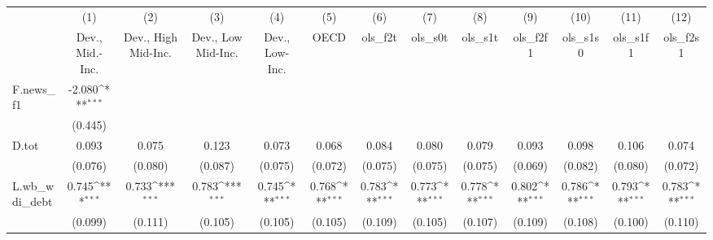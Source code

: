 {
\def\sym#1{\ifmmode^{#1}\else\(^{#1}\)\fi}
\begin{tabular}{l*{12}{c}}
\toprule
            &\multicolumn{1}{c}{(1)}&\multicolumn{1}{c}{(2)}&\multicolumn{1}{c}{(3)}&\multicolumn{1}{c}{(4)}&\multicolumn{1}{c}{(5)}&\multicolumn{1}{c}{(6)}&\multicolumn{1}{c}{(7)}&\multicolumn{1}{c}{(8)}&\multicolumn{1}{c}{(9)}&\multicolumn{1}{c}{(10)}&\multicolumn{1}{c}{(11)}&\multicolumn{1}{c}{(12)}\\
            &\multicolumn{1}{c}{Dev., Mid.-Inc.}&\multicolumn{1}{c}{Dev., High Mid-Inc.}&\multicolumn{1}{c}{Dev., Low Mid-Inc.}&\multicolumn{1}{c}{Dev., Low-Inc.}&\multicolumn{1}{c}{OECD}&\multicolumn{1}{c}{ols\_f2t}&\multicolumn{1}{c}{ols\_s0t}&\multicolumn{1}{c}{ols\_s1t}&\multicolumn{1}{c}{ols\_f2f1}&\multicolumn{1}{c}{ols\_s1s0}&\multicolumn{1}{c}{ols\_s1f1}&\multicolumn{1}{c}{ols\_f2s1}\\
\midrule
F.news\_f1   &      -2.080\sym{***}&                     &                     &                     &                     &                     &                     &                     &                     &                     &                     &                     \\
            &     (0.445)         &                     &                     &                     &                     &                     &                     &                     &                     &                     &                     &                     \\
\addlinespace
D.tot       &       0.093         &       0.075         &       0.123         &       0.073         &       0.068         &       0.084         &       0.080         &       0.079         &       0.093         &       0.098         &       0.106         &       0.074         \\
            &     (0.076)         &     (0.080)         &     (0.087)         &     (0.075)         &     (0.072)         &     (0.075)         &     (0.075)         &     (0.075)         &     (0.069)         &     (0.082)         &     (0.080)         &     (0.072)         \\
\addlinespace
L.wb\_wdi\_debt&       0.745\sym{***}&       0.733\sym{***}&       0.783\sym{***}&       0.745\sym{***}&       0.768\sym{***}&       0.783\sym{***}&       0.773\sym{***}&       0.778\sym{***}&       0.802\sym{***}&       0.786\sym{***}&       0.793\sym{***}&       0.783\sym{***}\\
            &     (0.099)         &     (0.111)         &     (0.105)         &     (0.105)         &     (0.105)         &     (0.109)         &     (0.105)         &     (0.107)         &     (0.109)         &     (0.108)         &     (0.100)         &     (0.110)         \\

\end{tabular}}
